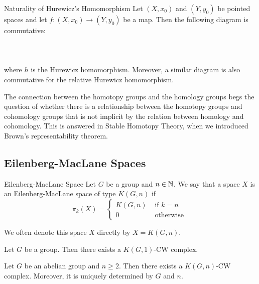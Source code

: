 \documentclass[a4paper]{article}
\begin{document}
\begin{thm}{Naturality of Hurewicz's Homomorphism}{} Let $(X,x_0)$ and $(Y,y_0)$ be pointed spaces and let $f:(X,x_0)\to(Y,y_0)$ be a map. Then the following diagram is commutative: \\~\\
\\~\\
where $h$ is the Hurewicz homomorphism. Moreover, a similar diagram is also commutative for the relative Hurewicz homomorphism. 
\end{thm}

The connection between the homotopy groups and the homology groups begs the question of whether there is a relationship between the homotopy groups and cohomology groups that is not implicit by the relation between homology and cohomology. This is answered in Stable Homotopy Theory, when we introduced Brown's representability theorem. 

\subsection{Eilenberg-MacLane Spaces}
\begin{defn}{Eilenberg-MacLane Space}{} Let $G$ be a group and $n\in\mathbb{N}$. We say that a space $X$ is an Eilenberg-MacLane space of type $K(G,n)$ if $$\pi_k(X)=\begin{cases}
K(G,n) & \text{ if } k=n\\
0 & \text{ otherwise }
\end{cases}$$
\end{defn}

We often denote this space $X$ directly by $X=K(G,n)$. 

\begin{prp}{}{} Let $G$ be a group. Then there exists a $K(G,1)$-CW complex. 
\end{prp}

\begin{thm}{}{} Let $G$ be an abelian group and $n\geq 2$. Then there exists a $K(G,n)$-CW complex. Moreover, it is uniquely determined by $G$ and $n$. 
\end{thm}
\end{document}
